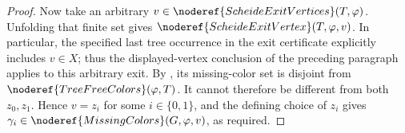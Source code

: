 \begin{proof}
Now take an arbitrary $v\in\noderef{ScheideExitVertices}(T,\varphi)$.
Unfolding that finite set gives
$\noderef{ScheideExitVertex}(T,\varphi,v)$.  In particular, the specified
last tree occurrence in the exit certificate explicitly includes
$v\in X$; thus the displayed-vertex conclusion of the preceding
paragraph applies to this arbitrary exit.  By
, its missing-color set is disjoint from
$\noderef{TreeFreeColors}(\varphi,T)$.  It cannot therefore be different
from both $z_0,z_1$.  Hence $v=z_i$ for some $i\in\{0,1\}$, and the
defining choice of $z_i$ gives
$\gamma_i\in\noderef{MissingColors}(G,\varphi,v)$, as required.
\end{proof}
